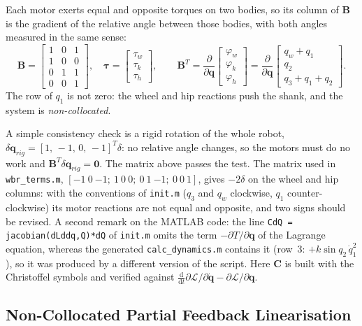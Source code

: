 \documentclass[11pt,a4paper]{article}
\newcommand{\bq}{\bm{q}}
\newcommand{\bdq}{\dot{\bm{q}}}
\newcommand{\btau}{\bm{\tau}}
\newcommand{\bC}{\bm{C}}
\newcommand{\bB}{\bm{B}}
\begin{document}
Each motor exerts equal and opposite torques on two bodies, so its column of $\bB$ is the
gradient of the relative angle between those bodies, with both angles measured in the same
sense:
\begin{equation}
    \bB=\begin{bmatrix}1&0&1\\1&0&0\\0&1&1\\0&0&1\end{bmatrix},\quad
    \btau=\begin{bmatrix}\tau_w\\ \tau_k\\ \tau_h\end{bmatrix},\qquad
    \bB^{T}=\frac{\partial}{\partial\bq}\begin{bmatrix}\varphi_w\\ \varphi_k\\ \varphi_h\end{bmatrix}
    =\frac{\partial}{\partial\bq}\begin{bmatrix}q_w+q_1\\ q_2\\ q_3+q_1+q_2\end{bmatrix}.
\end{equation}
The row of $q_1$ is not zero: the wheel and hip reactions push the shank, and the system is
\emph{non-collocated}.

A simple consistency check is a rigid rotation of the whole robot,
$\delta\bq_{rig} = [1,\,-1,\,0,\,-1]^T\delta$: no relative angle changes, so the motors must do
no work and $\bB^T\delta\bq_{rig} = \bm{0}$.  The matrix above passes the test.  The matrix used
in \texttt{wbr\_terms.m}, $[-1\ 0\ {-1};\ 1\ 0\ 0;\ 0\ 1\ {-1};\ 0\ 0\ 1]$, gives $-2\delta$ on
the wheel and hip columns: with the conventions of \texttt{init.m} ($q_3$ and $q_w$ clockwise,
$q_1$ counter-clockwise) its motor reactions are not equal and opposite, and two signs should be
revised.  A second remark on the MATLAB code: the line
\texttt{CdQ = jacobian(dLddq,Q)*dQ} of \texttt{init.m} omits the term $-\partial T/\partial\bq$
of the Lagrange equation, whereas the generated \texttt{calc\_dynamics.m} contains it (row~3:
$+k\sin q_2\,\dot q_1^2$), so it was produced by a different version of the script.  Here $\bC$
is built with the Christoffel symbols and verified against
$\frac{\mathrm{d}}{\mathrm{d}t}\partial\mathcal{L}/\partial\bdq - \partial\mathcal{L}/\partial\bq$.

\subsection{Non-Collocated Partial Feedback Linearisation}
\end{document}
